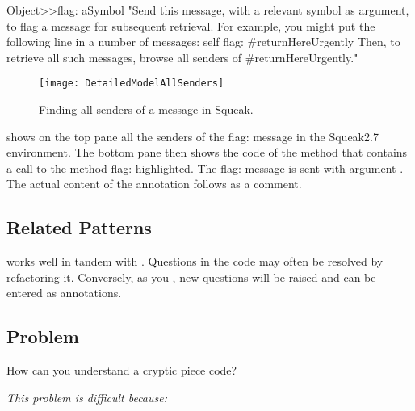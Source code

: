 \documentclass[a4paper,10pt,twoside]{book}
\begin{document}
\begin{code}
Object>>flag: aSymbol
	"Send this message, with a relevant symbol as argument, to flag
	a message for subsequent retrieval. For example, you might put 
	the following line in a number of messages:
		self flag: #returnHereUrgently
	Then, to retrieve all such messages, browse all senders of
	#returnHereUrgently."
\end{code}

\begin{figure}
\begin{center}
\texttt{[image: DetailedModelAllSenders]}
\caption{Finding all senders of a message in Squeak.}
\end{center}
\end{figure}

 shows on the top pane all the senders of the flag: message in the Squeak2.7 environment. The bottom pane then shows the code of the method  that contains a call to the method flag: highlighted. The flag: message is sent with argument . The actual content of the annotation follows as a comment. 

\subsection*{Related Patterns}

 works well in tandem with . Questions in the code may often be resolved by refactoring it. Conversely, as you , new questions will be raised and can be entered as annotations.



\subsection*{Problem}

How can you understand a cryptic piece code?

\emph{This problem is difficult because:}
\end{document}
